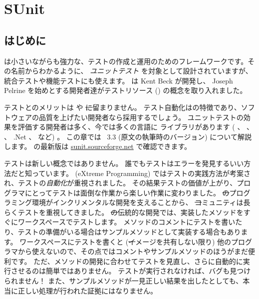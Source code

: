 \documentclass[a4paper,10pt,twoside]{book}
\begin{document}
	\sloppy
\fi
\chapter{SUnit}


\section{はじめに}

 は小さいながらも強力な、テストの作成と運用のためのフレームワークです。その名前からわかるように、 \emph{ユニットテスト} を対象として設計されていますが、統合テストや機能テストにも使えます。 \sunit は Kent Beck が開発し、 Joseph Pelrine を始めとする開発者達がテストリソース () の概念を取り入れました。


テストとのメリットは \pharo や \st に留まりません。
テスト自動化はの特徴であり、ソフトウェアの品質を上げたい開発者なら採用するでしょう。 
ユニットテストの効果を評価する開発者は多く、今では多くの言語に \xUnit ライブラリがあります ( 、  、  、 .Net 、 など) 。
この章では \SUnit~3.3 (原文の執筆時のバージョン) について解説します。
\sunit の最新版は \url{sunit.sourceforge.net} で確認できます。

テストは新しい概念ではありません。
誰でもテストはエラーを発見するいい方法だと知っています。
\mbox{} (eXtreme Programming) ではテストの実践方法が考案され、テストの\emph{自動化}が重視されました。
その結果テストの価値が上がり、プログラマにとってテストは面倒な作業から楽しい作業に変わりました。
\st のプログラミング環境がインクリメンタルな開発を支えることから、 \st コミュニティは長らくテストを重視してきました。
\st の伝統的な開発では、実装したメソッドをすぐにワークスペースでテストします。
メソッドのコメントにテストを書いたり、テストの準備がいる場合はサンプルメソッドとして実装する場合もあります。
ワークスペースにテストを書くと (\st イメージを共有しない限り) 他のプログラマから使えないので、その点ではコメントやサンプルメソッドのほうがまだ便利です。
ただ、メソッドの開発に合わせてテストを見直し、さらに自動的に実行させるのは簡単ではありません。
テストが実行されなければ、バグも見つけられません！
また、サンプルメソッドが一見正しい結果を出したとしても、本当に正しい処理が行われた証拠にはなりません。
\end{document}
